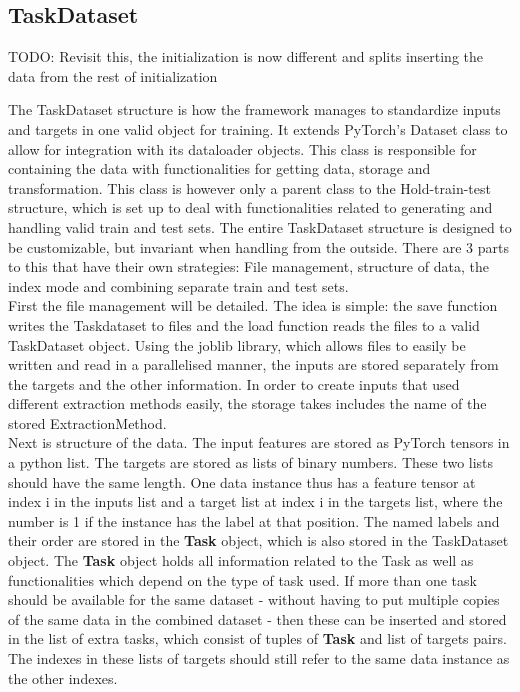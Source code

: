 \subsection{TaskDataset} \label{Impl:DataRead:TaskDataset}

TODO: Revisit this, the initialization is now different and splits inserting the data from the rest of initialization


The TaskDataset structure is how the framework manages to standardize inputs and targets in one valid object for training. It extends PyTorch's Dataset class to allow for integration with its dataloader objects. This class is responsible for containing the data with functionalities for getting data, storage and transformation. This class is however only a parent class to the Hold-train-test structure, which is set up to deal with functionalities related to generating and handling valid train and test sets. The entire TaskDataset structure is designed to be customizable, but invariant when handling from the outside. There are 3 parts to this that have their own strategies: File management, structure of data, the index mode and combining separate train and test sets. \\

First the file management will be detailed. The idea is simple: the save function writes the Taskdataset to files and the load function reads the files to a valid TaskDataset object. Using the joblib library, which allows files to easily be written and read in a parallelised manner, the inputs are stored separately from the targets and the other information. In order to create inputs that used different extraction methods easily, the storage takes includes the name of the stored ExtractionMethod. \\

Next is structure of the data. The input features are stored as PyTorch tensors in a python list. The targets are stored as lists of binary numbers. These two lists should have the same length. One data instance thus has a feature tensor at index i in the inputs list and a target list at index i in the targets list, where the number is 1 if the instance has the label at that position. The named labels and their order are stored in the \textbf{Task} object, which is also stored in the TaskDataset object. The \textbf{Task} object holds all information related to the Task as well as functionalities which depend on the type of task used. If more than one task should be available for the same dataset - without having to put multiple copies of the same data in the combined dataset - then these can be inserted and stored in the list of extra tasks, which consist of tuples of \textbf{Task} and list of targets pairs. The indexes in these lists of targets should still refer to the same data instance as the other indexes. \\

